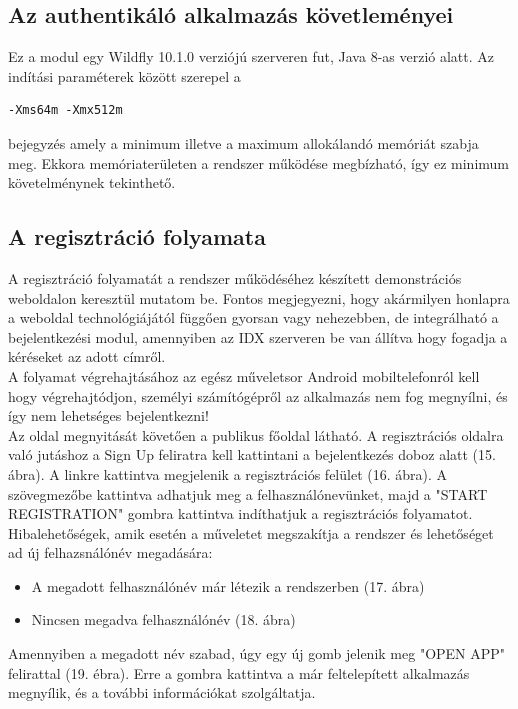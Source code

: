 \subsection{Az authentikáló alkalmazás követleményei}

Ez a modul egy Wildfly 10.1.0 verziójú szerveren fut, Java 8-as verzió alatt. Az indítási paraméterek között szerepel a
\begin{verbatim}
-Xms64m -Xmx512m 
\end{verbatim}
bejegyzés amely a minimum illetve a maximum allokálandó memóriát szabja meg. Ekkora memóriaterületen a rendszer működése megbízható, így ez minimum követelménynek tekinthető.

\subsection{A regisztráció folyamata}
A regisztráció folyamatát a rendszer működéséhez készített demonstrációs weboldalon keresztül mutatom be. Fontos megjegyezni, hogy akármilyen honlapra a weboldal technológiájától függően gyorsan vagy nehezebben, de integrálható a bejelentkezési modul, amennyiben az IDX szerveren be van állítva hogy fogadja a kéréseket az adott címről.
\\A folyamat végrehajtásához az egész műveletsor Android mobiltelefonról kell hogy végrehajtódjon, személyi számítógépről az alkalmazás nem fog megnyílni, és így nem lehetséges bejelentkezni!
\\Az oldal megnyitását követően a publikus főoldal látható. A regisztrációs oldalra való jutáshoz a Sign Up feliratra kell kattintani a bejelentkezés doboz alatt (15. ábra). A linkre kattintva megjelenik a regisztrációs felület (16. ábra). A szövegmezőbe kattintva adhatjuk meg a felhasználónevünket, majd a "START REGISTRATION" gombra kattintva indíthatjuk a regisztrációs folyamatot. Hibalehetőségek, amik esetén a műveletet megszakítja a rendszer és lehetőséget ad új felhazsnálónév megadására:
\begin{itemize}
\item A megadott felhasználónév már létezik a rendszerben (17. ábra)
\item Nincsen megadva felhasználónév (18. ábra)
\end{itemize}

Amennyiben a megadott név szabad, úgy egy új gomb jelenik meg "OPEN APP" felirattal (19. ébra). 
Erre a gombra kattintva a már feltelepített alkalmazás megnyílik, és a további információkat szolgáltatja.

